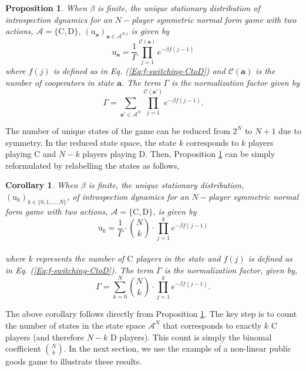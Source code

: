 \documentclass[11pt]{article}
\theoremstyle{plainCl1}
\newtheorem{Prop}{Proposition}
\theoremstyle{plainCl2}
\newtheorem{Corollary}{Corollary}
\newcommand{\abf}{\mathbf{a}}
\newcommand{\C}{\mathrm{C}}
\newcommand{\D}{\mathrm{D}}
\begin{document}
\begin{Prop}
\label{Prop:Symmetric-2-strategies-state}
When $\beta$ is finite, the unique stationary distribution of introspection dynamics for an $N-$player symmetric normal form game with two actions, $\mathcal{A} = \{\C, \D \}$, $(\mathrm{u}_{\abf})_{\abf \in \mathcal{A}^N}$, is given by
\begin{equation}
\label{Eq:stationary-dist-symm-2-stgs-state}
\mathrm{u}_\abf = \frac{1}{\Gamma} \displaystyle \prod_{j=1}^{\mathcal{C}(\abf)} \displaystyle e^{-\beta f(j-1)}
\end{equation}
where $f(j)$ is defined as in Eq. (\ref{Eq:f-switching-CtoD}) and $\mathcal{C}(\abf)$ is the number of cooperators in state $\abf$. The term $\Gamma$ is the normalization factor given by
\begin{equation}
\label{Eq:stationary-dist-normalization-symm-2-stgs-state}
\Gamma = \displaystyle \sum_{\abf' \in \mathcal{A}^N} \prod_{j = 1}^{\mathcal{C}(\abf')} \displaystyle e^{-\beta f(j-1)}.
\end{equation}
\end{Prop}


\noindent The number of unique states of the game can be reduced from $2^N$ to $N+1$  due to symmetry. In the reduced state space, the state $k$ corresponds to $k$ players playing $\C$ and $N-k$ players playing $\D$. Then, Proposition \ref{Prop:Symmetric-2-strategies-state} can be simply reformulated by relabelling the states as follows,


\begin{Corollary}
\label{Lemma: Symmetric-2-stg}
When $\beta$ is finite, the unique stationary distribution, $(\mathrm{u}_k)_{k \in \{0,1,...,N\}}$, of introspection dynamics for an $N-$player symmetric normal form game with two actions, $\mathcal{A} = \{\C, \D \}$, is given by \\
\begin{equation}
\label{Eq:stationary-dist-symm-2-stgs}
\mathrm{u}_k = \frac{1}{\Gamma} \cdot {N \choose k} \cdot \displaystyle \prod_{j=1}^{k} \displaystyle e^{-\beta f(j-1)}
\end{equation} \\ 
where $k$ represents the number of $\C$ players in the state and $f(j)$ is defined as in Eq. (\ref{Eq:f-switching-CtoD}). The term $\Gamma$ is the normalization factor, given by, \\
\begin{equation}
\label{Eq:normalization-Tk}
\Gamma = \displaystyle \sum_{k=0}^N {N \choose k} \cdot \displaystyle \prod_{j=1}^{k} \displaystyle e^{-\beta f(j-1)} .
\end{equation}
\end{Corollary}
\noindent The above corollary follows directly from Proposition \ref{Prop:Symmetric-2-strategies-state}. The key step is to count the number of states in the state space $\mathcal{A}^N$ that corresponds to exactly $k$ $\C$ players (and therefore $N-k$ $\D$ players). This count is simply the binomal coefficient $N \choose k$. In the next section, we use the example of a non-linear public goods game to illustrate these results. 
\end{document}
